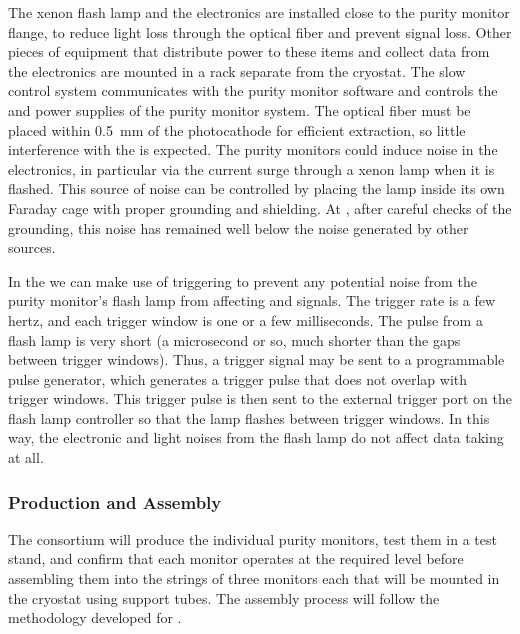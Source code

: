 The xenon flash lamp and the  electronics are installed close to the purity monitor flange, to reduce light loss through the optical fiber and prevent signal loss. Other pieces of equipment that distribute power to these items and collect data from the electronics are mounted in a rack separate from the cryostat. The slow control system communicates with the purity monitor  software and controls  the  and  power supplies of the purity monitor system. The optical fiber must be placed within  \SI{0.5}{\milli\meter} of the photocathode for efficient \phel extraction, so little interference with the  is expected. The purity monitors could induce noise in the  electronics, in particular via the current surge through a xenon lamp when it is flashed.  This source of noise can be controlled by placing the lamp inside its own Faraday cage with %
proper grounding and shielding. %
At , after careful checks of the grounding, this noise has remained well below the noise generated by other sources.

In the  we can make use of triggering to prevent any potential noise from the purity monitor's flash lamp from affecting  and  signals. The  trigger rate is a few hertz, and each trigger window is one or a few milliseconds. %
The pulse from a flash lamp is very short (a microsecond or so, much shorter than the gaps between  trigger windows). 
Thus, a  trigger signal may be sent to a programmable pulse generator, %
which generates a trigger pulse that does not overlap with  trigger windows. This trigger pulse %
is then sent to the external trigger port on the flash lamp  controller so that the lamp flashes between  trigger windows. In this way, the electronic and light noises from the flash lamp do %
not affect %
data taking at all.



\subsubsection{Production and Assembly}
\label{sec:PrMon-Production-Assembly}

The  consortium will produce the individual purity monitors, test them in a test stand, and confirm that each monitor operates at the required level before assembling them into the strings of three monitors each that will be mounted in the  cryostat using support tubes. The assembly process will follow the methodology developed for .



